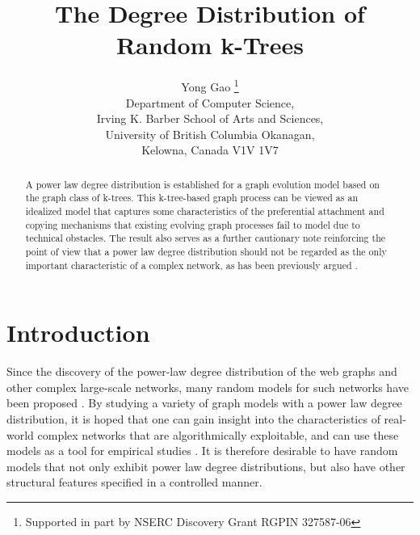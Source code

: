 \documentclass[11pt]{article}
\providecommand{\ktree}{k-tree}
\providecommand{\ktrees}{k-trees}
\begin{document}
\title{The Degree Distribution of Random k-Trees}


\author{Yong Gao \thanks{Supported in part by NSERC Discovery Grant RGPIN 327587-06} \\
    Department of Computer Science, \\
    Irving K. Barber School of Arts and Sciences, \\
    University of British Columbia Okanagan, \\
    Kelowna, Canada V1V 1V7
}
\maketitle

\begin{abstract}
A power law degree distribution is established for
a graph evolution model based on the graph class of \ktrees. This \ktree-based
graph process
can be viewed as an idealized model that captures some characteristics of
the preferential attachment and copying mechanisms that existing evolving graph processes
fail to model due to technical obstacles. The result also serves as a further cautionary note
reinforcing the point of view that a power law degree distribution
should not be regarded as
the only important characteristic of a complex network, as has been previously argued \cite{dimitris05power,li05,mitzenmacher05}.





\end{abstract}
 
 


\section{Introduction}

Since the discovery of the power-law degree distribution of the web graphs and other complex large-scale networks, many random models
for such networks have been proposed \cite{albert02complex,bollobas01scalefree,cooper03,dorogovtsev02}.
By studying a variety of graph models with a power law degree distribution, it is hoped that one can gain insight into the characteristics
of real-world complex networks that are algorithmically exploitable, and can use these models as a tool for empirical studies \cite{chakrabarti06}.
It is therefore desirable to have random models that not only exhibit power law degree distributions, but also have other
structural features specified in a controlled manner.
\end{document}
